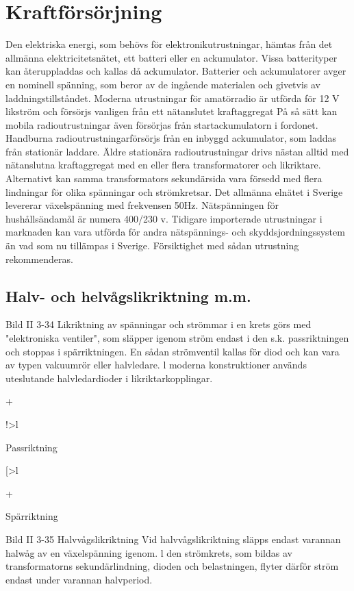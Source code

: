 \section{Kraftförsörjning}

Den elektriska energi, som behövs för elektronikutrustningar, hämtas från det allmänna elektricitetsnätet, ett batteri eller en ackumulator. Vissa batterityper kan återuppladdas och kallas då ackumulator.
Batterier och ackumulatorer avger en
nominell spänning, som beror av de ingående materialen och givetvis av laddningstillståndet. Moderna utrustningar för amatörradio är utförda för 12 V likström och försörjs
vanligen från ett nätanslutet kraftaggregat
På så sätt kan mobila radioutrustningar även
försörjas från startackumulatorn i fordonet.
Handburna radioutrustningarförsörjs från
en inbyggd ackumulator, som laddas från
stationär laddare.
Äldre stationära radioutrustningar drivs
nästan alltid med nätanslutna kraftaggregat
med en eller flera transformatorer och likriktare. Alternativt kan samma transformators
sekundärsida vara försedd med flera lindningar för olika spänningar och strömkretsar.
Det allmänna elnätet i Sverige levererar
växelspänning med frekvensen 50Hz. Nätspänningen för hushållsändamål är numera
400/230 v.
Tidigare importerade utrustningar i marknaden kan vara utförda för andra nätspännings- och skyddsjordningssystem än vad
som nu tillämpas i Sverige. Försiktighet med
sådan utrustning rekommenderas.

\subsection{Halv- och helvågslikriktning m.m.}

Bild II 3-34
Likriktning av spänningar och strömmar i en
krets görs med "elektroniska ventiler", som
släpper igenom ström endast i den s.k. passriktningen och stoppas i spärriktningen. En
sådan strömventil kallas för diod och kan
vara av typen vakuumrör eller halvledare. l
moderna konstruktioner används uteslutande halvledardioder i likriktarkopplingar.

+

!>l

Passriktning

[>l

+

Spärriktning

Bild II 3-35
Halvvågslikriktning
Vid halvvågslikriktning släpps endast varannan halwåg av en växelspänning igenom. l
den strömkrets, som bildas av transformatorns sekundärlindning, dioden och belastningen, flyter därför ström endast under
varannan halvperiod.

